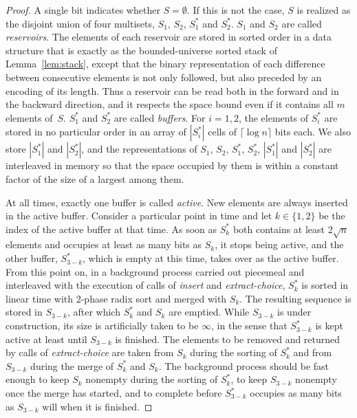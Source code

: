\documentclass[envcountsame,envcountsect,undated,nolinenumbers]{lnthi}
\def\Tvn#1{\hbox{\textit{#1\/}}}
\def\Tceil#1{\lceil #1\rceil}
\begin{document}
\begin{proof}
A single bit indicates whether $S=\emptyset$.
If this is not the case, $S$ is realized as the disjoint union
of four multisets,
$S_1$, $S_2$, $S^*_1$ and $S^*_2$.
$S_1$ and $S_2$ are called \emph{reservoirs}.
The elements of each reservoir are stored
in sorted order in a data structure that is
exactly as the bounded-universe sorted stack
of Lemma~\ref{lem:stack}, except that the
binary representation of each
difference between consecutive elements
is not only followed, but also
preceded by an encoding of its length.
Thus a reservoir can be read both in the
forward and in the backward direction,
and it respects the space bound even if
it contains all $m$ elements of~$S$.
$S^*_1$ and $S^*_2$ are called \emph{buffers}.
For $i=1,2$, the elements of $S^*_i$
are stored in no
particular order in an array of $|S^*_i|$ cells
of $\Tceil{\log n}$ bits each.
We also store $|S^*_1|$ and $|S^*_2|$, and the representations
of $S_1$, $S_2$, $S^*_1$, $S^*_2$,
$|S^*_1|$ and $|S^*_2|$ are interleaved in
memory so that the space occupied by them is within
a constant factor of the size of a largest among them.

At all times, exactly one buffer is called \emph{active}.
New elements are always inserted in the active buffer.
Consider a particular point in time and
let $k\in\{1,2\}$ be the index of the active
buffer at that time.
As soon as $S^*_k$ both contains at least
$2\sqrt{n}$ elements and occupies at least as many
bits as $S_k$, it stops
being active, and the other buffer, $S^*_{3-k}$,
which is empty at this time, takes over as the active buffer.
From this point on, in a background process carried out
piecemeal and interleaved with the execution of
calls of \Tvn{insert} and \Tvn{extract-choice},
$S^*_k$ is sorted in linear time with
2-phase radix sort and merged with $S_k$.
The resulting sequence is stored in $S_{3-k}$,
after which $S^*_k$ and $S_k$ are emptied.
While $S_{3-k}$ is under construction, its size
is artificially taken to be $\infty$, in the sense
that $S^*_{3-k}$ is kept active at least until
$S_{3-k}$ is finished.
The elements to be removed and returned by calls
of \Tvn{extract-choice} are taken from $S_k$
during the sorting of $S^*_k$ and from
$S_{3-k}$ during the merge of $S^*_k$ and $S_k$.
The background process should be fast enough
to keep $S_k$ nonempty during the sorting of $S^*_k$,
to keep $S_{3-k}$ nonempty once the
merge has started, and to complete before
$S^*_{3-k}$ occupies as many bits as $S_{3-k}$
will when it is finished.


\end{proof}
\end{document}
